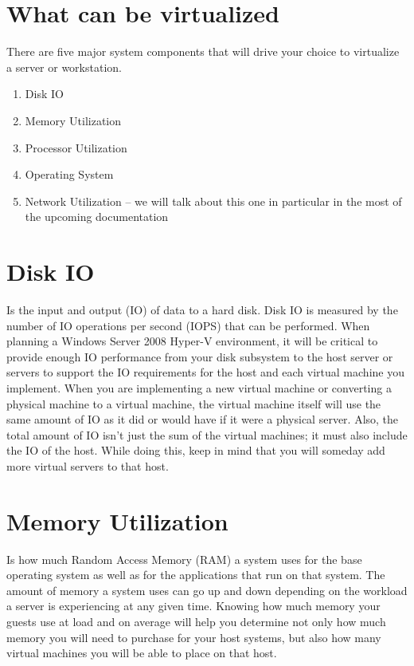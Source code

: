 \vspace{5mm}
\section{What can be virtualized}
\vspace{5mm}

There are five major system components that will drive your choice to virtualize a server or workstation.
\begin{enumerate}
\item Disk IO
\item Memory Utilization
\item Processor Utilization
\item Operating System
\item Network Utilization – we will talk about this one in particular in the most of the upcoming documentation
\end{enumerate}

\section{Disk IO}

Is the input and output (IO) of data to a hard disk. Disk IO is measured by the number of IO operations per second (IOPS) that can be performed. When planning a
Windows Server 2008 Hyper-V environment, it will be critical to provide enough IO performance from your disk subsystem to the host server or servers to support the IO 
requirements for the host and each virtual machine you implement. When you are implementing a new virtual machine or converting a physical machine to a virtual machine, 
the virtual machine itself will use the same amount of IO as it did or would have if it were a physical server. Also, the total amount of IO isn’t just the sum of the virtual 
machines; it must also include the IO of the host. While doing this, keep in mind that you will someday add more virtual servers to that host.
\vspace{5mm}

\section{Memory Utilization}

\vspace{5mm}
Is how much Random Access Memory (RAM) a system uses for the base
operating system as well as for the applications that run on that system. The amount of memory a system uses can go up and down depending on the workload a server is experiencing
at any given time. Knowing how much memory your guests use at load and on average will help you determine not only how much memory you will need to purchase for your host
systems, but also how many virtual machines you will be able to place on that host.

